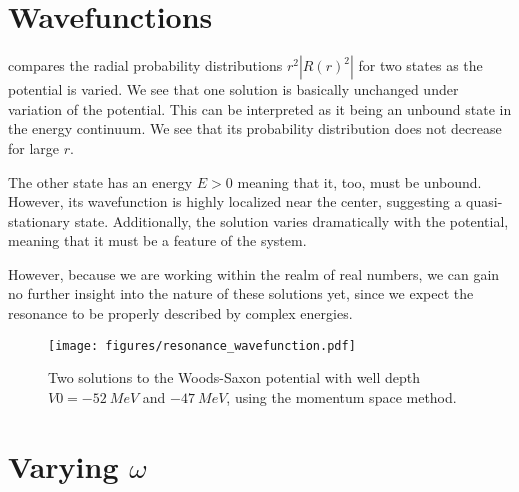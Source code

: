 \section{Wavefunctions}

 compares the radial probability distributions $r^2|R(r)^2|$ for two states as the potential is varied. We see that one solution is basically unchanged under variation of the potential. This can be interpreted as it being an unbound state in the energy continuum. We see that its probability distribution does not decrease for large $r$.

The other state has an energy $E>0$ meaning that it, too, must be unbound. However, its wavefunction is highly localized near the center, suggesting a quasi-stationary state. Additionally, the solution varies dramatically with the potential, meaning that it must be a feature of the system. 

However, because we are working within the realm of real numbers, we can gain no further insight into the nature of these solutions yet, since we expect the resonance to be properly described by complex energies. 


\begin{figure}
  \centering
  \texttt{[image: figures/resonance\_wavefunction.pdf]}
  \caption{Two solutions to the Woods-Saxon potential with well depth $V0=\SI{-52}{MeV}$ and $\SI{-47}{MeV}$, using the momentum space method.}
  \label{fig:resonance wavefunction}
\end{figure}

\section{Varying $\omega$}
